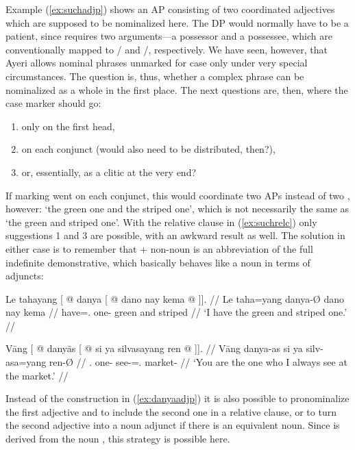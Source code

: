 Example (\ref{ex:suchadjp}) shows an AP consisting of two coordinated 
adjectives which are supposed to be nominalized here. The DP would normally 
have to be a patient, since  requires two 
arguments---a possessor and a possessee, which are conventionally mapped to 
\Sbj{}/\Aarg{} and \Obj{}/\Parg{}, respectively. We have seen, however, that 
Ayeri allows nominal phrases unmarked for case only under very special 
circumstances. The question is, thus, whether a complex phrase can be 
nominalized as a whole in the first place. The next questions are, then, where 
the case marker should go:

\begin{enumerate}[noitemsep]
	\item only on the first head,
	\item on each conjunct (would  also need to be 
		distributed, then?),
	\item or, essentially, as a clitic at the very end?
\end{enumerate}

\noindent If marking went on each conjunct, this would coordinate two APs 
instead of two , however: `the green one and the striped one', which
is not necessarily the same as `the green and striped one'. With the relative
clause in (\ref{ex:suchrelc}) only suggestions 1 and 3 are possible, with an
awkward result as well. The solution in either case is to remember that 
 + non-noun is an abbreviation of the full indefinite 
demonstrative, which basically behaves like a noun in terms of adjuncts:

\pex
\a\label{ex:danyaadjp}\begingl
	\gla Le tahayang {\normalfont [} @ danya {\normalfont 
		[} @ dano nay kema @ {\normalfont]]}. //
	\glb Le taha=yang {} danya-Ø {} dano nay kema {} //
	\glc \PatTI{} have=\Fsg{}.\Aarg{} {} one-\Top{} {} green and striped {} //
	\glft `I have the green and striped one.' //
\endgl

\a\begingl
	\gla Vāng {\normalfont [} @ danyās {\normalfont[} 
		@ si ya silvasayang ren @ {\normalfont ]]}. //
	\glb Vāng {} danya-as {} si ya silv-asa=yang ren-Ø {} //
	\glc \Second.\Aarg{} {} one-\Parg{} {} \Rel{} \LocT{} 
		see-\Hab{}=\Fsg{}.\Aarg{} market-\Top{} {} //
	\glft `You are the one who I always see at the market.' //
\endgl
\xe

Instead of the construction in (\ref{ex:danyaadjp}) it is also possible to
pronominalize the first adjective and to include the second one in a relative 
clause, or to turn the second adjective into a noun adjunct if there is an
equivalent noun. Since  is derived from the noun
, this strategy is possible here.

